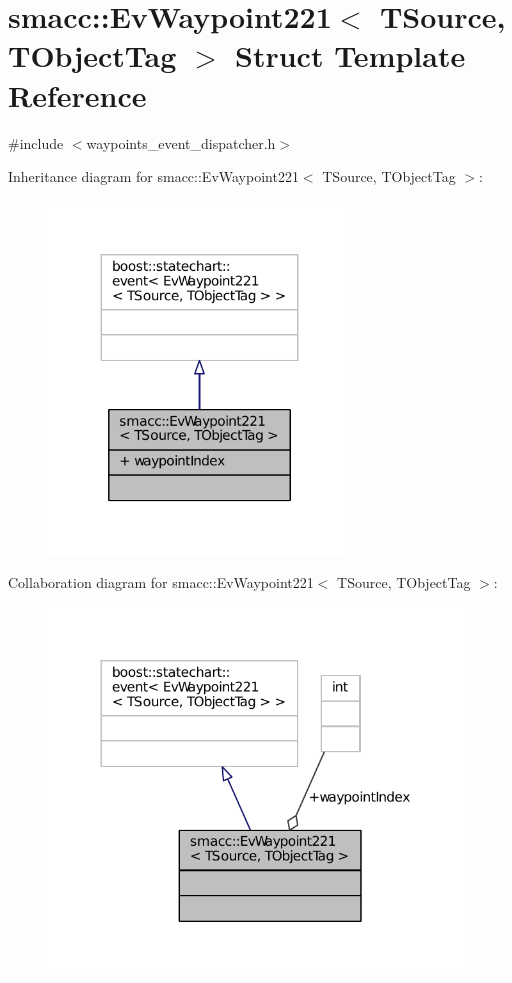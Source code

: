 \hypertarget{structsmacc_1_1EvWaypoint221}{}\section{smacc\+:\+:Ev\+Waypoint221$<$ T\+Source, T\+Object\+Tag $>$ Struct Template Reference}
\label{structsmacc_1_1EvWaypoint221}


{\ttfamily \#include $<$waypoints\+\_\+event\+\_\+dispatcher.\+h$>$}



Inheritance diagram for smacc\+:\+:Ev\+Waypoint221$<$ T\+Source, T\+Object\+Tag $>$\+:
\nopagebreak
\begin{figure}[H]
\begin{center}
\leavevmode
\includegraphics[width=227pt]{structsmacc_1_1EvWaypoint221__inherit__graph}
\end{center}
\end{figure}


Collaboration diagram for smacc\+:\+:Ev\+Waypoint221$<$ T\+Source, T\+Object\+Tag $>$\+:
\nopagebreak
\begin{figure}[H]
\begin{center}
\leavevmode
\includegraphics[width=312pt]{structsmacc_1_1EvWaypoint221__coll__graph}
\end{center}
\end{figure}
